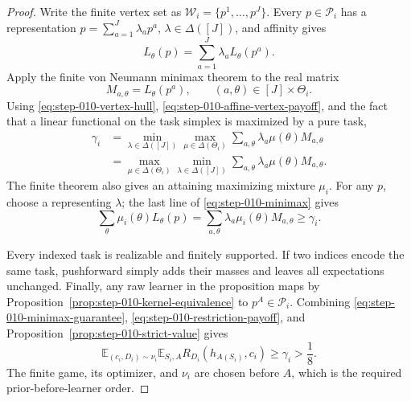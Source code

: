 \begin{proof}
Write the finite vertex set as
\(\mathcal W_i=\{p^1,\ldots,p^J\}\).  Every
\(p\in\mathcal P_i\) has a representation
\(p=\sum_{a=1}^J\lambda_ap^a\), \(\lambda\in\Delta([J])\), and affinity
gives
\begin{equation}\label{eq:step-010-affine-vertex-payoff}
L_\theta(p)=\sum_{a=1}^J\lambda_aL_\theta(p^a).
\end{equation}
Apply the finite von Neumann minimax theorem to the real matrix
\begin{equation}\label{eq:step-010-game-matrix}
M_{a,\theta}=L_\theta(p^a),
\qquad(a,\theta)\in[J]\times\Theta_i.
\end{equation}
Using \eqref{eq:step-010-vertex-hull},
\eqref{eq:step-010-affine-vertex-payoff}, and the fact that a linear
functional on the task simplex is maximized by a pure task,
\begin{equation}\label{eq:step-010-minimax}
\begin{split}
\gamma_i
&=\min_{\lambda\in\Delta([J])}
  \max_{\mu\in\Delta(\Theta_i)}
  \sum_{a,\theta}\lambda_a\mu(\theta)M_{a,\theta}\\
&=\max_{\mu\in\Delta(\Theta_i)}
  \min_{\lambda\in\Delta([J])}
  \sum_{a,\theta}\lambda_a\mu(\theta)M_{a,\theta}.
\end{split}
\end{equation}
The finite theorem also gives an attaining maximizing mixture \(\mu_i\).
For any \(p\), choose a representing \(\lambda\); the last line of
\eqref{eq:step-010-minimax} gives
\begin{equation}\label{eq:step-010-minimax-guarantee}
\sum_\theta\mu_i(\theta)L_\theta(p)
=\sum_{a,\theta}\lambda_a\mu_i(\theta)M_{a,\theta}
\ge\gamma_i.
\end{equation}

Every indexed task is realizable and finitely supported.  If two indices
encode the same task, pushforward simply adds their masses and leaves all
expectations unchanged.  Finally, any raw learner in the proposition maps
by Proposition~\ref{prop:step-010-kernel-equivalence} to
\(p^A\in\mathcal P_i\).  Combining
\eqref{eq:step-010-minimax-guarantee},
\eqref{eq:step-010-restriction-payoff}, and
Proposition~\ref{prop:step-010-strict-value} gives
\[
\mathbb E_{(c_i,D_i)\sim\nu_i}
\mathbb E_{S_i,A}R_{D_i}(h_{A(S_i)},c_i)
\ge\gamma_i>\frac18.
\]
The finite game, its optimizer, and \(\nu_i\) are chosen before \(A\),
which is the required prior-before-learner order.
\end{proof}

